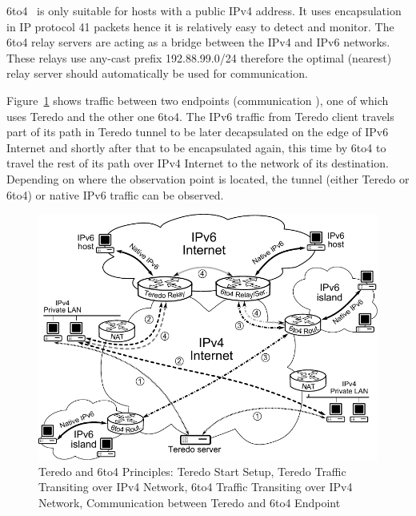 6to4~\cite{rfc3056} is only suitable for hosts with a public IPv4 address. It uses encapsulation in IP protocol 41 packets hence it is relatively easy to detect and monitor. The 6to4 relay servers are acting as a bridge between the IPv4 and IPv6 networks. These relays use any-cast prefix 192.88.99.0/24 therefore the optimal (nearest) relay server should automatically be used for communication.

Figure~\ref{fig:ipv6-tunnels-monitoring-schema} shows traffic between two endpoints (communication ), one of which uses Teredo and the other one 6to4. The IPv6 traffic from Teredo client travels part of its path in Teredo tunnel to be later decapsulated on the edge of IPv6 Internet and shortly after that to be encapsulated again, this time by 6to4 to travel the rest of its path over IPv4 Internet to the network of its destination. Depending on where the observation point is located, the tunnel (either Teredo or 6to4) or native IPv6 traffic can be observed.

\begin{figure}[!tb]
        \centering
        \includegraphics[width=1.00\linewidth]{figures/paper-tunnels/tunely-schema}
        \caption{Teredo and 6to4 Principles:  Teredo Start Setup,  Teredo Traffic Transiting over IPv4 Network,  6to4 Traffic Transiting over IPv4 Network,  Communication between Teredo and 6to4 Endpoint}
        \label{fig:ipv6-tunnels-monitoring-schema}
\end{figure}


